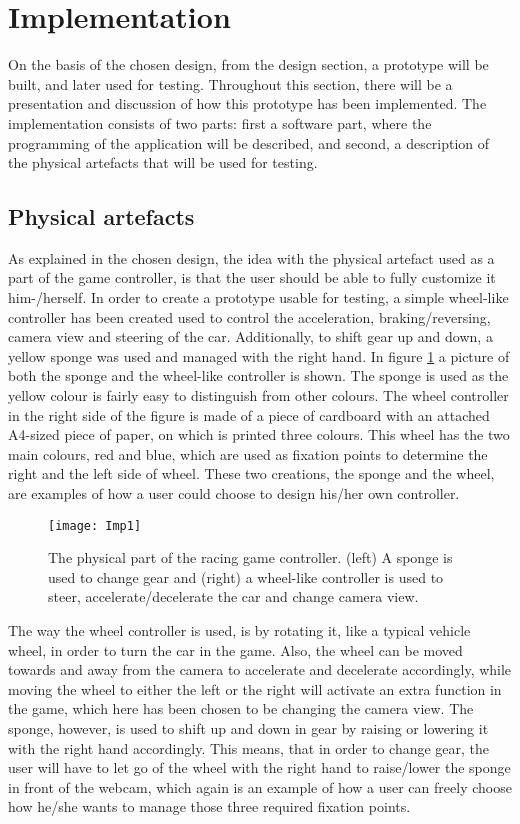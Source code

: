 \section{Implementation} \label{sec:implementation}
On the basis of the chosen design, from the design section, a prototype will be built, and later used for testing.
Throughout this section, there will be a presentation and discussion of how this prototype has been implemented. 
The implementation consists of two parts: first a software part, where the programming of the application will be described, and second, a description of the physical artefacts that will be used for testing.

\subsection{Physical artefacts}
As explained in the chosen design, the idea with the physical artefact used as a part of the game controller, is that the user should be able to fully customize it him-/herself. 
In order to create a prototype usable for testing, a simple wheel-like controller has been created used to control the acceleration, braking/reversing, camera view and steering of the car. 
Additionally, to shift gear up and down, a yellow sponge was used and managed with the right hand. 
In figure \ref{fig:imp1} a picture of both the sponge and the wheel-like controller is shown. 
The sponge is used as the yellow colour is fairly easy to distinguish from other colours. 
The wheel controller in the right side of the figure is made of a piece of cardboard with an attached A4-sized piece of paper, on which is printed three colours. 
This wheel has the two main colours, red and blue, which are used as fixation points to determine the right and the left side of wheel. 
These two creations, the sponge and the wheel, are examples of how a user could choose to design his/her own controller.
\bigskip

\begin{figure}[!htbp]
\centering
\texttt{[image: Imp1]}
\caption{The physical part of the racing game controller. (left) A sponge is used to change gear and (right) a wheel-like controller is used to steer, accelerate/decelerate the car and change camera view.} 
\label{fig:imp1}
\end{figure}

The way the wheel controller is used, is by rotating it, like a typical vehicle wheel, in order to turn the car in the game. 
Also, the wheel can be moved towards and away from the camera to accelerate and decelerate accordingly, while moving the wheel to either the left or the right will activate an extra function in the game, which here has been chosen to be changing the camera view. 
The sponge, however, is used to shift up and down in gear by raising or lowering it with the right hand accordingly. 
This means, that in order to change gear, the user will have to let go of the wheel with the right hand to raise/lower the sponge in front of the webcam, which again is an example of how a user can freely choose how he/she wants to manage those three required fixation points.

